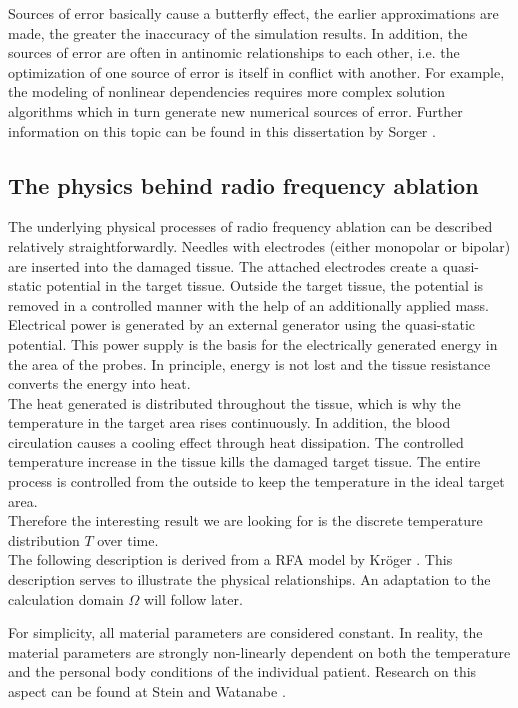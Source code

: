 \documentclass[parskip=half, titlepage=yes, 12pt, BCOR=12mm, DIV=calc]{scrartcl}
\begin{document}
Sources of error basically cause a butterfly effect, the earlier approximations are made, the greater the inaccuracy of the simulation results. In addition, the sources of error are often in antinomic relationships to each other, i.e. the optimization of one source of error is itself in conflict with another. For example, the modeling of nonlinear dependencies requires more complex solution algorithms which in turn generate new numerical sources of error. Further information on this topic can be found in this dissertation by Sorger \cite{sorger}.


\subsection{The physics behind radio frequency ablation}
The underlying physical processes of radio frequency ablation can be described relatively straightforwardly.
Needles with electrodes (either monopolar or bipolar) are inserted into the damaged tissue. The attached electrodes create a quasi-static potential in the target tissue. Outside the target tissue, the potential is removed in a controlled manner with the help of an additionally applied mass. \\

Electrical power is generated by an external generator using the quasi-static potential. This power supply is the basis for the electrically generated energy in the area of the probes.
In principle, energy is not lost and the tissue resistance converts the energy into heat. \\

The heat generated is distributed throughout the tissue, which is why the temperature in the target area rises continuously. 
In addition, the blood circulation causes a cooling effect through heat dissipation. The controlled temperature increase in the tissue kills the damaged target tissue. The entire process is controlled from the outside to keep the temperature in the ideal target area. \\

Therefore the interesting result we are looking for is the discrete temperature distribution $\si{T}$ over time. \\

The following description is derived from a RFA model by Kröger \cite{kroeger}. This description serves to illustrate the physical relationships. An adaptation to the calculation domain $\Omega$ will follow later.

For simplicity, all material parameters are considered constant. In reality, the material parameters are strongly non-linearly dependent on both the temperature and the personal body conditions of the individual patient. Research on this aspect can be found at Stein \cite{stein} and Watanabe \cite{watanabe}. \\
\end{document}
